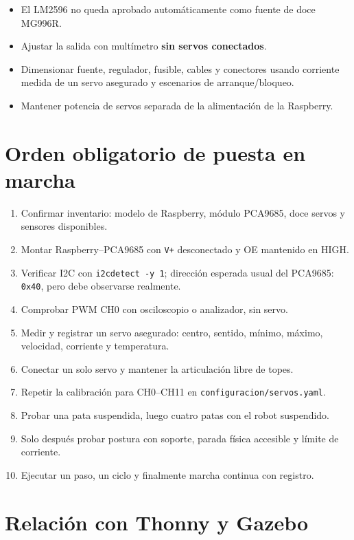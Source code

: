 \documentclass[11pt,a4paper]{article}
\newcommand{\code}[1]{\texttt{#1}}
\begin{document}
\begin{itemize}[leftmargin=7mm]
\item El LM2596 no queda aprobado automáticamente como fuente de doce MG996R.
\item Ajustar la salida con multímetro \textbf{sin servos conectados}.
\item Dimensionar fuente, regulador, fusible, cables y conectores usando corriente medida de un servo asegurado y escenarios de arranque/bloqueo.
\item Mantener potencia de servos separada de la alimentación de la Raspberry.
\end{itemize}

\newpage
\section{Orden obligatorio de puesta en marcha}

\begin{enumerate}[leftmargin=8mm]
\item Confirmar inventario: modelo de Raspberry, módulo PCA9685, doce servos y sensores disponibles.
\item Montar Raspberry--PCA9685 con \code{V+} desconectado y OE mantenido en HIGH.
\item Verificar I2C con \code{i2cdetect -y 1}; dirección esperada usual del PCA9685: \code{0x40}, pero debe observarse realmente.
\item Comprobar PWM CH0 con osciloscopio o analizador, sin servo.
\item Medir y registrar un servo asegurado: centro, sentido, mínimo, máximo, velocidad, corriente y temperatura.
\item Conectar un solo servo y mantener la articulación libre de topes.
\item Repetir la calibración para CH0--CH11 en \code{configuracion/servos.yaml}.
\item Probar una pata suspendida, luego cuatro patas con el robot suspendido.
\item Solo después probar postura con soporte, parada física accesible y límite de corriente.
\item Ejecutar un paso, un ciclo y finalmente marcha continua con registro.
\end{enumerate}

\section{Relación con Thonny y Gazebo}
\end{document}
